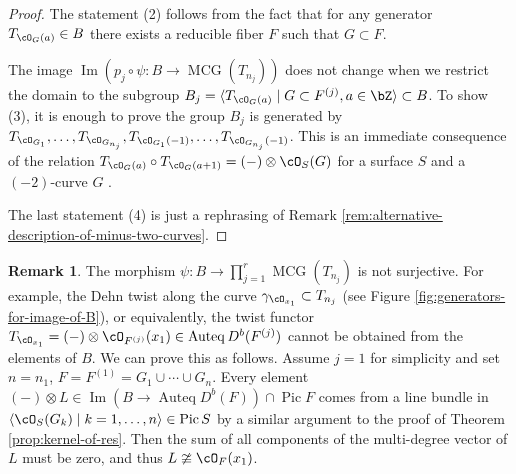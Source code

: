 \documentclass[12pt]{amsart}
\makeatletter
\numberwithin{equation}{section}
\theoremstyle{plain}
\theoremstyle{definition}
\newtheorem{remark}[theorem]{Remark}
\DeclareMathOperator{\Auteq}{\mathrm{Auteq}}
\DeclareMathOperator{\Pic}{\mathrm{Pic}}
\DeclareMathOperator{\MCG}{\mathrm{MCG}}
\DeclareMathOperator{\PMCG}{\mathrm{PMCG}}
\DeclareMathOperator{\Image}{\mathrm{Im}}
\newcommand*{\rom}[1]{\expandafter\@slowromancap\romannumeral #1@}
\makeatother
\begin{document}
\begin{proof}
    The statement (2) follows from the fact that for any generator $T_{\cO_G(a)} \in B$ there exists a reducible fiber $F$ such that $G \subset F$.

    The image $\Image(p_j \circ \psi \colon B \to \MCG(T_{n_j}))$ does not change when we restrict the domain to the subgroup $B_j = \langle T_{\cO_G(a)} \mid G \subset F^{(j)}, a \in \bZ \rangle \subset B$.
    To show (3), it is enough to prove the group $B_j$ is generated by $T_{\cO_{G_1}}, \dots, T_{\cO_{G_{n_j}}}, T_{\cO_{G_1}(-1)}, \dots, T_{\cO_{G_{n_j}}(-1)}$.
    This is an immediate consequence of the relation $T_{\cO_G(a)} \circ T_{\cO_G(a+1)} = (-)\otimes \cO_S(G)$ for a surface $S$ and a $(-2)$-curve $G$ \cite[Lemma 4.15 (i)]{MR2198807}.

    The last statement (4) is just a rephrasing of Remark \ref{rem:alternative-description-of-minus-two-curves}.
\end{proof}


\begin{remark}\label{rm:psi-is-not-surjective}
    The morphism $\psi \colon B \to \prod_{j=1}^r \MCG(T_{n_j})$ is not surjective.
    For example, the Dehn twist along the curve $\gamma_{\cO_{x_1}} \subset T_{n_j}$ (see Figure \ref{fig:generators-for-image-of-B}),
    or equivalently,
    the twist functor $T_{\cO_{x_1}} = (-)\otimes \cO_{F^{(j)}}(x_1) \in \Auteq{D^b(F^{(j)})}$ cannot be obtained from the elements of $B$.
    We can prove this as follows.
    Assume $j = 1$ for simplicity and set $n = n_1$, $F = F^{(1)} = G_1 \cup \cdots \cup G_n$.
    Every element $(-) \otimes L \in \Image(B \to \Auteq D^b(F)) \cap \Pic F$ comes from a line bundle in $\langle \cO_S(G_k) \mid k = 1, \dots, n\rangle \in \Pic S$ by a similar argument to the proof of Theorem \ref{prop:kernel-of-res}.
    Then the sum of all components of the multi-degree vector of $L$ must be zero, and thus $L \ncong \cO_{F}(x_1)$.
\end{remark}

\end{document}

